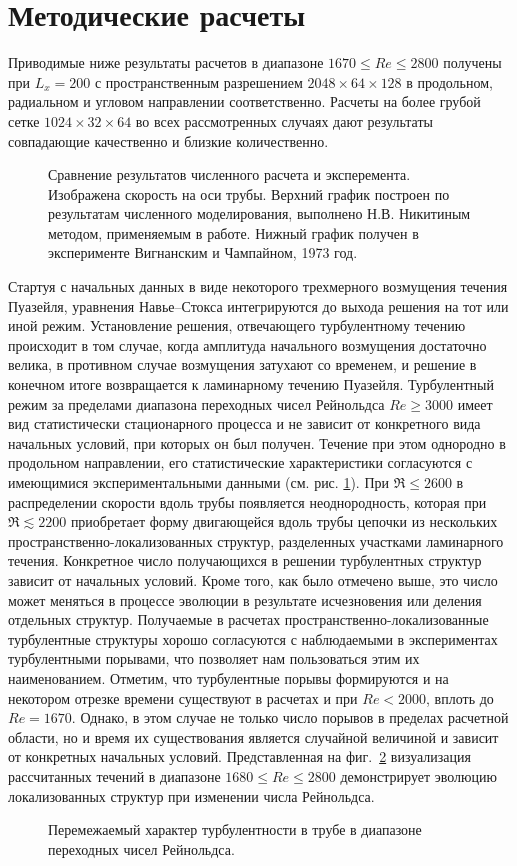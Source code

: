 \section{Методические расчеты}



Приводимые ниже результаты расчетов в диапазоне $1670\leqslant Re\leqslant 2800$ получены при $L_x=200$ с пространственным разрешением $2048 \times 64 \times 128$ в продольном, радиальном и угловом направлении соответственно. Расчеты на более грубой сетке $1024\times32\times64$ во всех рассмотренных случаях дают результаты совпадающие качественно и близкие количественно.

\begin{figure}[h]
\caption{Сравнение результатов численного расчета и эксперемента. Изображена скорость на оси трубы. Верхний график построен по результатам численного моделирования, выполнено Н.В. Никитиным методом, применяемым в работе. Нижный график получен в эксперименте Вигнанским и Чампайном, 1973 год.}
\label{exper_img}
\end{figure}

Стартуя с начальных данных в виде некоторого трехмерного возмущения течения Пуазейля, уравнения Навье--Стокса интегрируются до выхода решения на тот или иной режим. Установление решения, отвечающего турбулентному течению происходит в том случае, когда амплитуда начального возмущения достаточно велика, в противном случае возмущения затухают со временем, и решение в конечном итоге возвращается к ламинарному течению Пуазейля. Турбулентный режим за пределами диапазона переходных чисел Рейнольдса $Re\geqslant3000$ имеет вид статистически стационарного процесса и не зависит от конкретного вида начальных условий, при которых он был получен. Течение при этом однородно в продольном направлении, его статистические характеристики согласуются с имеющимися экспериментальными данными (см. рис. \ref{exper_img}). При $\Re\leqslant2600$ в распределении скорости вдоль трубы появляется неоднородность, которая при $\Re\lesssim2200$ приобретает форму двигающейся вдоль трубы цепочки из нескольких пространственно-локализованных структур, разделенных участками ламинарного течения. Конкретное число получающихся в решении турбулентных структур зависит от начальных условий. Кроме того, как было отмечено выше, это число может меняться в процессе эволюции в результате исчезновения или деления отдельных структур. Получаемые в расчетах пространственно-локализованные турбулентные структуры хорошо согласуются с наблюдаемыми в экспериментах турбулентными порывами, что позволяет нам пользоваться этим их наименованием. Отметим, что турбулентные порывы формируются и на некотором отрезке времени существуют в расчетах и при $Re<2000$, вплоть до $Re=1670$. Однако, в этом случае не только число порывов в пределах расчетной области, но и время их существования является случайной величиной и зависит от конкретных начальных условий. Представленная на фиг.~\ref{puffs_img} визуализация рассчитанных течений в диапазоне $1680\leqslant Re\leqslant2800$ демонстрирует эволюцию локализованных структур при изменении числа Рейнольдса.

\begin{figure}[h]
\caption{Перемежаемый характер турбулентности в трубе в диапазоне переходных чисел Рейнольдса.}
\label{puffs_img}
\end{figure}

